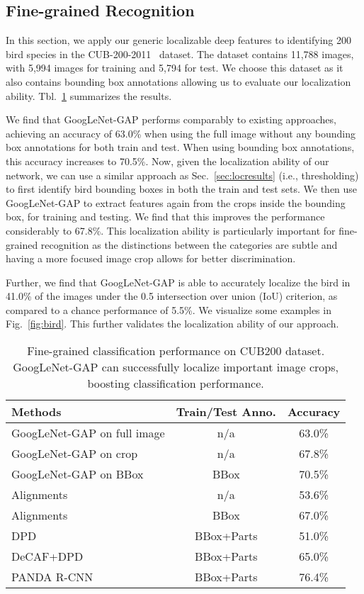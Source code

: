 \documentclass[10pt,twocolumn,letterpaper]{article}
\begin{document}
\subsection{Fine-grained Recognition}
\label{sec:finegrained}

In this section, we apply our generic localizable deep features to identifying 200 bird species in the CUB-200-2011~\cite{WelinderEtal2010} dataset. The dataset contains 11,788 images, with 5,994 images for training and 5,794 for test. We choose this dataset as it also contains bounding box annotations allowing us to evaluate our localization ability. Tbl.~\ref{birdresult} summarizes the results.

We find that GoogLeNet-GAP performs comparably to existing approaches, achieving an accuracy of 63.0\% when using the full image without any bounding box annotations for both train and test. When using bounding box annotations, this accuracy increases to 70.5\%. Now, given the localization ability of our network, we can use a similar approach as Sec.~\ref{sec:locresults} (i.e., thresholding) to first identify bird bounding boxes in both the train and test sets. We then use GoogLeNet-GAP to extract features again from the crops inside the bounding box, for training and testing. We find that this improves the performance considerably to 67.8\%. This localization ability is particularly important for fine-grained recognition as the distinctions between the categories are subtle and having a more focused image crop allows for better discrimination.

Further, we find that GoogLeNet-GAP is able to accurately localize the bird in 41.0\% of the images under the 0.5 intersection over union (IoU) criterion, as compared to a chance performance of 5.5\%. We visualize some examples in Fig.~\ref{fig:bird}. This further validates the localization ability of our approach.


\begin{table}\caption{Fine-grained classification performance on CUB200 dataset. GoogLeNet-GAP can successfully localize important image crops, boosting classification performance.}
\centering
\footnotesize
\begin{tabular}{ l | c | c }
\hline
  \hline                       
  Methods & Train/Test Anno. & Accuracy \\
    \hline  
    GoogLeNet-GAP on full image & n/a & 63.0\% \\
    GoogLeNet-GAP on crop & n/a & 67.8\% \\
	GoogLeNet-GAP on BBox & BBox & 70.5\% \\
    \hline   
    Alignments \cite{gavves2014local} & n/a & 53.6\% \\
    Alignments \cite{gavves2014local} & BBox & 67.0\%\\
    DPD \cite{zhang2013deformable} & BBox+Parts & 51.0\% \\
    DeCAF+DPD \cite{donahue2014decaf} & BBox+Parts & 65.0\%\\
    PANDA R-CNN \cite{zhang2014part} & BBox+Parts & 76.4\% \\
    \hline  
\end{tabular}\label{birdresult}
\end{table}
\end{document}
